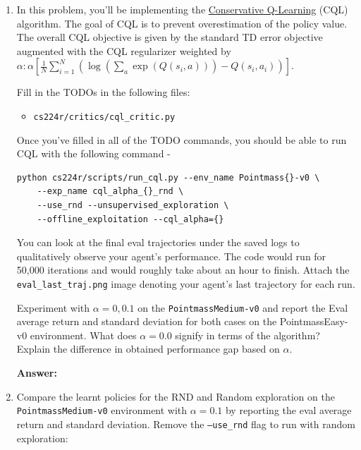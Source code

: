 \documentclass[12pt]{article}
\newcommand{\answer}[1]{{\bf \color{red}Answer:\\ #1}}
\begin{document}
\begin{enumerate}
\item In this problem, you'll be implementing the \href{https://arxiv.org/abs/2006.04779}{Conservative Q-Learning} (CQL) algorithm. The goal of CQL is to prevent overestimation of the policy value. The overall CQL objective is given by the standard TD error objective augmented with the CQL regularizer weighted by $\alpha: \alpha\left[\frac{1}{N} \sum_{i=1}^N\left(\log \left(\sum_a \exp \left(Q\left(s_i, a\right)\right)\right)-Q\left(s_i, a_i\right)\right)\right]$. 

Fill in the TODOs in the following files:
\begin{itemize}
    \item \texttt{cs224r/critics/cql\_critic.py}
\end{itemize}

Once you’ve filled in all of the TODO commands, you should be able to run CQL with the following command - 
\begin{tcolorbox}[width=\linewidth, sharp corners=all, colback=white!95!black]
\begin{verbatim}
python cs224r/scripts/run_cql.py --env_name Pointmass{}-v0 \
    --exp_name cql_alpha_{}_rnd \
    --use_rnd --unsupervised_exploration \
    --offline_exploitation --cql_alpha={}
\end{verbatim}
\end{tcolorbox}

\noindent
You can look at the final eval trajectories under the saved logs to qualitatively observe your agent's performance. The code would run for 50,000 iterations and would roughly take about an hour to finish. Attach the \texttt{eval\_last\_traj.png} image denoting your agent's last trajectory for each run.  %

\noindent
Experiment with $\alpha = 0, 0.1$ on the \texttt{PointmassMedium-v0} and report the Eval average return and standard deviation for both cases on the PointmassEasy-v0 environment. What does $\alpha=0.0$ signify in terms of the algorithm? Explain the difference in obtained performance gap based on $\alpha$.

\answer{}

\item Compare the learnt policies for the RND and Random exploration on the \\ \texttt{PointmassMedium-v0} environment with $\alpha=0.1$ by reporting the eval average return and standard deviation. 
Remove the \texttt{--use\_rnd} flag to run with random exploration:


\end{enumerate}
\end{document}
